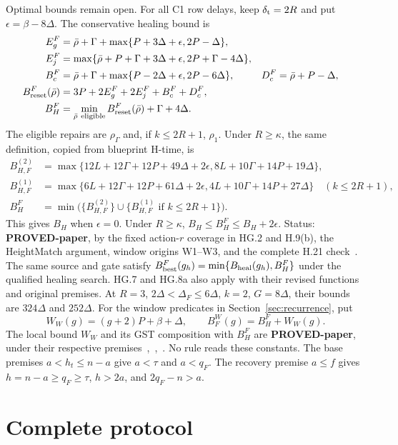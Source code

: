 \documentclass{article}
\theoremstyle{plain}
\theoremstyle{definition}
\theoremstyle{remark}
\begin{document}
Optimal bounds remain open.
For all C1 row delays, keep $\delta_{\rm t}=2R$ and put
$\epsilon=\beta-8\Delta$.  The conservative healing bound is~\cite[\S3]{RD}
\begin{align*}
 E_g^F&=\bar\rho+\Gamma+\max\{P+3\Delta+\epsilon,2P-\Delta\},\\
 E_j^F&=\max\{\bar\rho+P+\Gamma+3\Delta+\epsilon,2P+\Gamma-4\Delta\},\\
 B_c^F&=\bar\rho+\Gamma+\max\{P-2\Delta+\epsilon,2P-6\Delta\},&
 D_c^F&=\bar\rho+P-\Delta,\\
 B_{\rm reset}^F(\bar\rho)&=3P+2E_g^F+2E_j^F+B_c^F+D_c^F,\\
 B_H^F&=\min_{\bar\rho\ \mathrm{eligible}}B_{\rm reset}^F(\bar\rho)+\Gamma+4\Delta.
\end{align*}
The eligible repairs are $\rho_\Gamma$ and, if $k\leq2R+1$, $\rho_1$.
Under $R\geq\kappa$, the same definition, copied from blueprint H-time, is
\begin{align*}
 B_{H,F}^{(2)}&=\max\{12L+12\Gamma+12P+49\Delta+2\epsilon,
                         8L+10\Gamma+14P+19\Delta\},\\
 B_{H,F}^{(1)}&=\max\{6L+12\Gamma+12P+61\Delta+2\epsilon,
                         4L+10\Gamma+14P+27\Delta\}\quad(k\leq2R+1),\\
 B_H^F&=\min\bigl(\{B_{H,F}^{(2)}\}\cup
              \{B_{H,F}^{(1)}\text{ if }k\leq2R+1\}\bigr).
\end{align*}
This gives $B_H$ when $\epsilon=0$. Under $R\geq\kappa$,
$B_H\leq B_H^F\leq B_H+2\epsilon$. Status: \textbf{PROVED-paper},
by the fixed action-$r$ coverage in HG.2 and H.9(b), the HeightMatch
argument, window origins W1--W3, and the complete H.21 check~\cite{BPH}. The same source and gate satisfy
$B_{\rm best}^F(g_h)=\min\{B_{\rm heal}(g_h),B_H^F\}$ under the
qualified healing search. HG.7 and HG.8a also apply with their revised
functions and original premises. At $R=3$, $2\Delta<\Delta_F\leq6\Delta$,
$k=2$, $G=8\Delta$, their bounds are $324\Delta$ and $252\Delta$.
For the window predicates in Section~\ref{sec:recurrence}, put
\[
 W_W(g)=(g+2)P+\beta+\Delta,\qquad B_F^W(g)=B_H^F+W_W(g).
\]
The local bound $W_W$ and its GST composition with $B_H^F$ are
\textbf{PROVED-paper}, under their respective premises~\cite[\S5]{FW},~\cite[H.22]{BPH},~\cite[FF5--FF7]{BPF}.
No rule reads these constants.  The base premises $a<h_t\leq n-a$ give $a<\tau$
and $a<q_F$.  The recovery premise $a\leq f$ gives $h=n-a\geq q_F\geq
\tau$, $h>2a$, and $2q_F-n>a$.

\section{Complete protocol}\label{sec:complete-protocol}
\end{document}

